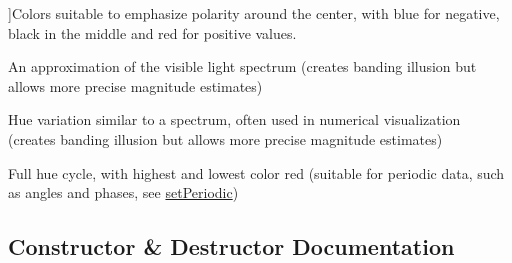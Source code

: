 \begin{Desc}
\begin{description}
{}]Colors suitable to emphasize polarity around the center, with blue for negative, black in the middle and red for positive values. \item[{\em 
\hypertarget{class_q_c_p_color_gradient_aed6569828fee337023670272910c9072ad63adc100ef46f6b4a8a6deacec4642f}{}gp\+Spectrum\label{class_q_c_p_color_gradient_aed6569828fee337023670272910c9072ad63adc100ef46f6b4a8a6deacec4642f}
}]An approximation of the visible light spectrum (creates banding illusion but allows more precise magnitude estimates) \item[{\em 
\hypertarget{class_q_c_p_color_gradient_aed6569828fee337023670272910c9072a5f8a9e67b64c17ddfe4f069fe2b9fb02}{}gp\+Jet\label{class_q_c_p_color_gradient_aed6569828fee337023670272910c9072a5f8a9e67b64c17ddfe4f069fe2b9fb02}
}]Hue variation similar to a spectrum, often used in numerical visualization (creates banding illusion but allows more precise magnitude estimates) \item[{\em 
\hypertarget{class_q_c_p_color_gradient_aed6569828fee337023670272910c9072a30efe58407acfb67939032f70213a130}{}gp\+Hues\label{class_q_c_p_color_gradient_aed6569828fee337023670272910c9072a30efe58407acfb67939032f70213a130}
}]Full hue cycle, with highest and lowest color red (suitable for periodic data, such as angles and phases, see \hyperlink{class_q_c_p_color_gradient_a39d6448155fc00a219f239220d14bb39}{set\+Periodic}) \end{description}
\end{Desc}


\subsection{Constructor \& Destructor Documentation}
\hypertarget{class_q_c_p_color_gradient_a546e44df5fa1846400a582c041361c85}{}
